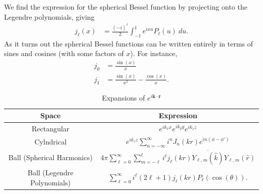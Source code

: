 \documentclass[10pt]{mypackage}
\begin{document}
  We find the expression for the spherical Bessel function by projecting onto the Legendre polynomials, giving
  \begin{align*}
    j_{\ell}\left( x \right) &= \frac{\left( -i \right)^{\ell}}{2} \int_{-1}^{1} e^{ixu}P_{\ell}\left( u \right)\:du.
  \end{align*}
  As it turns out the spherical Bessel functions can be written entirely in terms of sines and cosines (with some factors of $x$). For instance,
  \begin{align*}
    j_0 &= \frac{\sin\left( x \right)}{x}\\
    j_1 &= \frac{\sin\left( x \right)}{x^2} - \frac{\cos\left( x \right)}{x}.
  \end{align*}
  \begin{table}[h!]
    \centering
    \renewcommand{\arraystretch}{2}
    \begin{tabular}{c|c}
      Space & Expression\\
      \hline
      \hline
      Rectangular & $\displaystyle e^{ik_x x}e^{ik_y y}e^{ik_z z}$\\
      Cylndrical & $\displaystyle e^{ik_z z}\sum_{n=-\infty}^{\infty} i^n J_n\left( kr \right)e^{in\left( \phi-\phi' \right)}$\\
      Ball (Spherical Harmonics) & $\displaystyle 4\pi\sum_{\ell=0}^{\infty}\sum_{m=-\ell}^{\ell}i^{\ell}j_{\ell}\left( kr \right) \overline{Y_{\ell,m}\left( \hat{k} \right)}Y_{\ell,m}\left( \hat{r} \right)$\\
      Ball (Legendre Polynomials) & $\displaystyle \sum_{\ell=0}^{\infty}i^{\ell}\left( 2\ell + 1 \right)j_{\ell}\left( kr \right)P_{\ell}\left( \cos\left( \theta \right) \right)$.
    \end{tabular}
    \caption{Expansions of $e^{i\mathbf{k}\cdot \mathbf{r}}$}
  \end{table}
\end{document}
